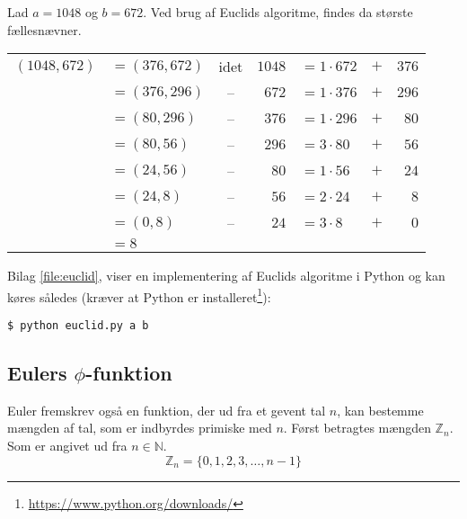     \begin{eks}
        Lad \(a = 1048\) og \(b = 672\).
        Ved brug af Euclids algoritme, findes da største fællesnævner.
        \begin{center}
            \setlength{\tabcolsep}{5pt} %
            \begin{tabular}{r l c r l c r}
                \((1048, 672)\) & \(= (376, 672)\) & idet & \(1048\) & \(= 1 \cdot 672\) & \(+\) & \(376\)\\
                                & \(= (376, 296)\) & --   & \(672\) & \(= 1 \cdot 376\)  & \(+\) & \(296\)\\
                                & \(= (80, 296)\)  & --   & \(376\) & \(= 1 \cdot 296\)  & \(+\) & \(80\)\\
                                & \(= (80, 56)\)   & --   & \(296\) & \(= 3 \cdot 80\)   & \(+\) & \(56\)\\
                                & \(= (24, 56)\)   & --   & \(80\)  & \(= 1 \cdot 56\)   & \(+\) & \(24\)\\
                                & \(= (24, 8)\)    & --   & \(56\)  & \(= 2 \cdot 24\)   & \(+\) & \(8\)\\
                                & \(= (0, 8)\)     & --   & \(24\)  & \(= 3 \cdot 8\)    & \(+\) & \(0\)\\
                                & \(= 8\) & & & & &
            \end{tabular}
        \end{center}
    \end{eks}
    Bilag \ref{file:euclid}, viser en implementering af Euclids algoritme i Python og kan køres således
    (kræver at Python er installeret\footnote{\url{https://www.python.org/downloads/}}):
    \begin{verbatim}
$ python euclid.py a b
    \end{verbatim}


    \subsection{Eulers \texorpdfstring{\(\phi\)}{Lg}-funktion}
    Euler fremskrev også en funktion, der ud fra et gevent tal \(n\), kan bestemme mængden af tal, som er indbyrdes primiske med \(n\).
    Først betragtes mængden \(\mathbb{Z}_n\). Som er angivet ud fra \(n \in \mathbb{N}\).
    \[\mathbb{Z}_n = \{0, 1, 2, 3, \hdots, n-1 \}\]

